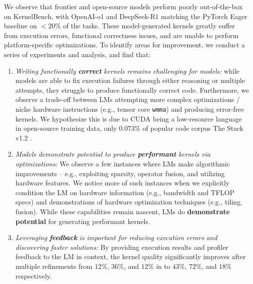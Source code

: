 

We observe that frontier and open-source models perform poorly out-of-the-box on KernelBench, with OpenAI-o1 and DeepSeek-R1 matching the PyTorch Eager baseline on $<20\%$ of the tasks. These model-generated kernels greatly suffer from execution errors, functional correctness issues, and are unable to perform platform-specific optimizations. To identify areas for improvement, we conduct a series of experiments and analysis, and find that:

\begin{enumerate}[itemsep=0.1pt,topsep=0pt,leftmargin=*]
    \item \textit{\textit{Writing functionally }\textit{\textbf{correct}}\textit{ kernels remains challenging for models:} }while models are able to fix execution failures through either reasoning or multiple attempts, they struggle to produce functionally correct code. Furthermore, we observe a trade-off between LMs attempting more complex optimizations / niche hardware instructions (e.g., tensor core \texttt{wmma}) and producing error-free kernels. We hypothesize this is due to CUDA being a low-resource language in open-source training data, only $0.073\%$ of popular code corpus The Stack v1.2 \cite{li2023starcodersourceyou, kocetkov2022stack3tbpermissively}.
    
    \item \textit{\textit{Models demonstrate potential to produce }\textit{\textbf{performant}}\textit{ kernels via optimizations:}} We observe a few instances where LMs make algorithmic improvements -- e.g., exploiting sparsity, operator fusion, and utilizing hardware features. We notice more of such instances when we explicitly condition the LM on hardware information (e.g., bandwidth and TFLOP specs) and demonstrations of hardware optimization techniques (e.g., tiling, fusion). While these capabilities remain nascent, LMs do \textbf{demonstrate potential} for generating performant kernels. 
    \item \textit{Leveraging}\textit{\textbf{ feedback}}\textit{ is important for reducing execution errors and discovering faster solutions:} By providing execution results and profiler feedback to the LM in context, the kernel quality significantly improves after multiple refinements from $12\%$, $36\%$, and $12\%$ in  to $43\%$, $72\%$, and $18\%$ respectively.
\end{enumerate}

